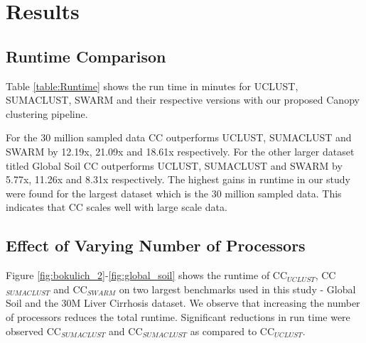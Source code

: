\documentclass[10pt, conference, compsocconf]{IEEEtran}
\begin{document}
\section{Results} 
\label{sec:Results}

\subsection{\textbf{Runtime Comparison}} Table \ref{table:Runtime} shows the run time in minutes for 
UCLUST, SUMACLUST, SWARM and their respective versions with our proposed Canopy clustering pipeline.


For the 30 million sampled data CC outperforms UCLUST, SUMACLUST and SWARM by 12.19x, 21.09x and 18.61x respectively. For the other larger dataset titled Global Soil CC outperforms UCLUST, SUMACLUST and SWARM by 5.77x, 11.26x and 8.31x respectively. The highest gains in runtime in our study were found for the largest dataset which is the 30 million sampled data. This indicates that CC scales well with large scale data.  


\subsection{\textbf{Effect of Varying Number of Processors}}
Figure \ref{fig:bokulich_2}-\ref{fig:global_soil} shows the runtime of CC$_{UCLUST}$, CC$_{SUMACLUST}$ and CC$_{SWARM}$ on two largest benchmarks used in this study - Global Soil and the 30M Liver Cirrhosis dataset. We observe that increasing the number of processors reduces the total runtime. Significant reductions in run time were observed CC$_{SUMACLUST}$ and CC$_{SUMACLUST}$ as 
compared to CC$_{UCLUST}$.  
\end{document}
